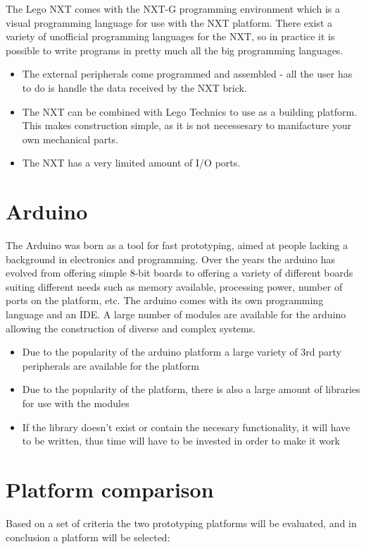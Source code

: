 The Lego NXT comes with the NXT-G programming environment which is a visual
programming language for use with the NXT platform. There exist a variety of
unofficial programming languages for the NXT, so in practice it is possible to
write programs in pretty much all the big programming languages.

\begin{itemize}
  \item The external peripherals come programmed and assembled - all the user
  has to do is handle the data received by the NXT brick.
  \item The NXT can be combined with Lego Technics to use as a building
  platform. This makes construction simple, as it is not necessesary to
  manifacture your own mechanical parts.
  \item The NXT has a very limited amount of I/O ports.
\end{itemize}

\section{Arduino}
The Arduino was born as a tool for fast prototyping, aimed at people lacking a
background in electronics and programming. Over the years the arduino has
evolved from offering simple 8-bit boards to offering a variety of different
boards suiting different needs such as memory available, processing power,
number of ports on the platform, etc. The arduino comes with its own
programming language and an IDE. A large number of modules are available for
the arduino allowing the construction of diverse and complex systems\Source.

\begin{itemize}
	\item Due to the popularity of the arduino platform a large variety of 3rd
	party peripherals are available for the platform
	\item Due to the popularity of the platform, there is also a large amount of
	libraries for use with the modules
	\item If the library doesn't exist or contain the necesary functionality, it
	will have to be written, thus time will have to be invested in order to make
	it work
\end{itemize}

\section{Platform comparison}
Based on a set of criteria the two prototyping platforms will be evaluated, and
in conclusion a platform will be selected:

